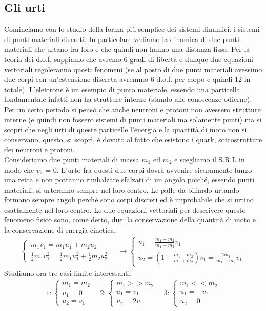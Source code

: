 \documentclass[10pt,a4paper]{article}
\begin{document}
\subsection{Gli urti}
Cominciamo con lo studio della forma più semplice dei sistemi dinamici: i sistemi di punti materiali discreti. In particolare vediamo la dinamica di due punti materiali che urtano fra loro e che quindi non hanno una distanza fissa. Per la teoria dei d.o.f. sappiamo che avremo 6 gradi di libertà e dunque due equazioni vettoriali regoleranno questi fenomeni (se al posto di due punti materiali avessimo due corpi con un'estensione discreta avremmo 6 d.o.f. per corpo e quindi 12 in totale). L'elettrone è un esempio di punto materiale, essendo una particella fondamentale infatti non ha strutture interne (stando alle conoscenze odierne). Per un certo periodo si pensò che anche neutroni e protoni non avessero strutture interne (e quindi non fossero sistemi di punti materiali ma solamente punti) ma si scoprì che negli urti di queste particelle l'energia e la quantità di moto non si conservano, questo, si scoprì, è dovuto al fatto che esistono i quark, sottostrutture dei neutroni e protoni.\\
Consideriamo due punti materiali di massa $m_1$ ed $m_2$ e scegliamo il S.R.I. in modo che $v_2$ = 0. L'urto fra questi due corpi dovrà avvenire sicuramente lungo una retta e non potranno rimbalzare sfalzati di un angolo poiché, essendo punti materiali, si urteranno sempre nel loro centro. Le palle da biliardo urtando formano sempre angoli perché sono corpi discreti ed è improbabile che si urtino esattamente nel loro centro. Le due equazioni vettoriali per descrivere questo fenomeno fisico sono, come detto, due: la conservazione della quantità di moto e la conservazione di energia cinetica. 
\begin{align*}
\begin{cases}
	m_1 v_1 = m_1 u_1 + m_2 u_2\\
	\frac{1}{2}m_1 v_1^2 = \frac{1}{2} m_1 u_1^2 + \frac{1}{2} m_2 u_2^2
\end{cases} \quad
\longrightarrow
\begin{cases}
	u_1 = \frac{m_1 - m_2}{m_1 + m_2} v_1\\
	u_2 = (1 + \frac{m_1 - m_2}{m_1 + m_2})v_1 = \frac{2m_1}{m_1+m_2} v_1
\end{cases}
\end{align*}
Studiamo ora tre casi limite interessanti:
\begin{align*}
	1:
	\begin{cases}
		m_1 = m_2\\
		u_1 = 0\\
		u_2 = v_1
	\end{cases}\quad
2:
	\begin{cases}
		m_1 >> m_2\\
		u_1 = v_1\\
		u_2 = 2v_1
	\end{cases}\quad
3:
	\begin{cases}
		m_1 << m_2\\
		u_1 = -v_1\\
		u_2 = 0
	\end{cases}
\end{align*}
\end{document}

